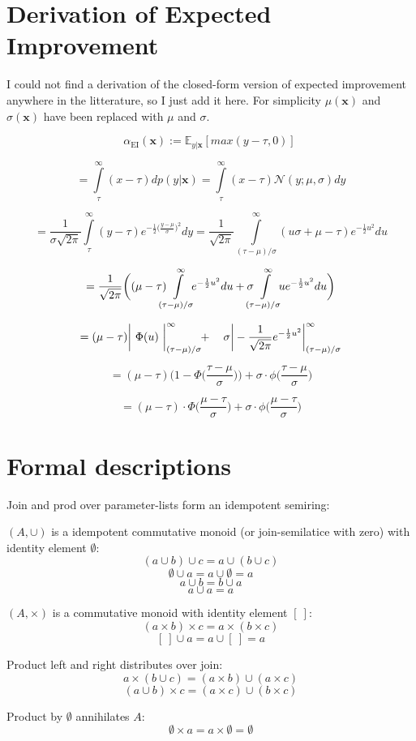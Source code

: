 \documentclass[english]{article}
\newcommand{\EI}{\operatorname{EI}}
\newcommand{\x}{\mathbf{x}}
\begin{document}
\newpage
\appendix

\section{Derivation of Expected Improvement}
\label{EI derivation}
I could not find a derivation of the closed-form version of expected improvement anywhere in the litterature, so I just add it here. For simplicity $\mu(\x)$ and $\sigma(\x)$ have been replaced with $\mu$ and $\sigma$.

$$\alpha_{\EI}(\x) := \mathbb{E}_{y|\x}[max(y-\tau, 0)]\ $$

$$= \int\limits_{\tau}^{\infty}(x-\tau)dp(y|\x) = \int\limits_{\tau}^{\infty}(x-\tau)\mathcal{N}(y;\mu,\sigma)dy$$

$$ = \frac{1}{\sigma\sqrt{2\pi}} \int\limits_{\tau}^{\infty}(y-\tau)e^{-\frac{1}{2}\big(\frac{y-\mu}{\sigma}\big)^2}dy =
\frac{1}{\sqrt{2\pi}} \int\limits_{(\tau-\mu)/\sigma}^{\infty}(u\sigma+\mu-\tau)e^{-\frac{1}{2}u^2}du$$

$$=\frac{1}{\sqrt{2\pi}}\bigg((\mu-\tau) \mkern-12mu \int\limits_{(\tau-\mu)/\sigma}^{\infty} \mkern-10mu e^{-\frac{1}{2}u^2}du + \sigma \mkern-12mu \int\limits_{(\tau-\mu)/\sigma}^{\infty} \mkern-10mu u e^{-\frac{1}{2}u^2}du \bigg)$$

$$=(\mu-\tau)\bigg|\ \Phi(u)\ \bigg|_{(\tau-\mu)/\sigma}^{\infty} \mkern-6mu + \ \ \ \sigma\bigg|-\frac{1}{\sqrt{2\pi}}e^{-\frac{1}{2}u^2}\bigg|_{(\tau-\mu)/\sigma}^{\infty}$$

$$=(\mu-\tau)\bigg(1-\Phi\bigg(\frac{\tau-\mu}{\sigma}\bigg)\bigg) + \sigma \cdot \phi \bigg(\frac{\tau-\mu}{\sigma}\bigg)$$

$$ = (\mu - \tau) \cdot \Phi \bigg(\frac{\mu-\tau}{\sigma}\bigg) + \sigma \cdot \phi \bigg(\frac{\mu-\tau}{\sigma}\bigg)$$


\section{Formal descriptions}
Join and prod over parameter-lists form an idempotent semiring:

$(A, \cup)$ is a idempotent commutative monoid (or join-semilatice with zero) with identity element $\emptyset$:
$$(a \cup b) \cup c = a \cup (b \cup c)$$
$$\emptyset \cup a = a \cup \emptyset = a$$
$$a \cup b = b \cup a$$
$$a \cup a = a$$

$(A, \times)$ is a commutative monoid with identity element $[\ ]$:
$$(a \times b) \times c = a \times (b \times c)$$
$$[\ ] \cup a = a \cup [\ ] = a$$

Product left and right distributes over join:
$$a\times(b \cup c) = (a\times b) \cup (a\times c)$$
$$(a \cup b)\times c = (a\times c) \cup (b\times c)$$

Product by $\emptyset$ annihilates $A$:
$$\emptyset \times a = a \times \emptyset = \emptyset$$


\printbibliography


 
\end{document}
